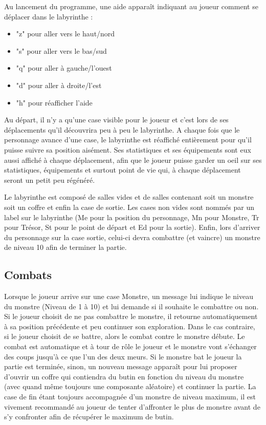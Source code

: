 \documentclass[a4paper]{article}
\begin{document}
Au lancement du programme, une aide apparaît indiquant au joueur comment se déplacer dans le labyrinthe :
\begin{itemize}
	\item "z" pour aller vers le haut/nord
	\item "s" pour aller vers le bas/sud
	\item "q" pour aller à gauche/l'ouest
	\item "d" pour aller à droite/l'est
	\item "h" pour réafficher l'aide
\end{itemize}

Au départ, il n'y a qu'une case visible pour le joueur et c'est lors de ses déplacements qu'il découvrira peu à peu le labyrinthe.
A chaque fois que le personnage avance d'une case, le labyrinthe est réaffiché entièrement pour qu'il puisse suivre sa position aisément.
Ses statistiques et ses équipements sont eux aussi affiché à chaque déplacement, afin que le joueur puisse garder un oeil sur ses statistiques, équipements et surtout point de vie qui, à chaque déplacement seront un petit peu régénéré.

Le labyrinthe est composé de salles vides et de salles contenant soit un monstre soit un coffre et enfin la case de sortie.
Les cases non vides sont nommés par un label sur le labyrinthe (Me pour la position du personnage, Mn pour Monstre, Tr pour Trésor, St pour le point de départ et Ed pour la sortie).
Enfin, lors d'arriver du personnage sur la case sortie, celui-ci devra combattre (et vaincre) un monstre de niveau 10 afin de terminer la partie.


    \subsection{Combats}

Lorsque le joueur arrive sur une case Monstre, un message lui indique le niveau du monstre (Niveau de 1 à 10) et lui demande si il souhaite le combattre ou non.
Si le joueur choisit de ne pas combattre le monstre, il retourne automatiquement à sa position précédente et peu continuer son exploration.
Dans le cas contraire, si le joueur choisit de se battre, alors le combat contre le monstre débute.
Le combat est automatique et à tour de rôle le joueur et le monstre vont s'échanger des coups jusqu'à ce que l'un des deux meurs.
Si le monstre bat le joueur la partie est terminée, sinon, un nouveau message apparaît pour lui proposer d'ouvrir un coffre qui contiendra du butin en fonction du niveau du monstre (avec quand même toujours une composante aléatoire) et continuer la partie.
La case de fin étant toujours accompagnée d'un monstre de niveau maximum, il est vivement recommandé au joueur de tenter d'affronter le plus de monstre avant de s'y confronter afin de récupérer le maximum de butin.
\end{document}
